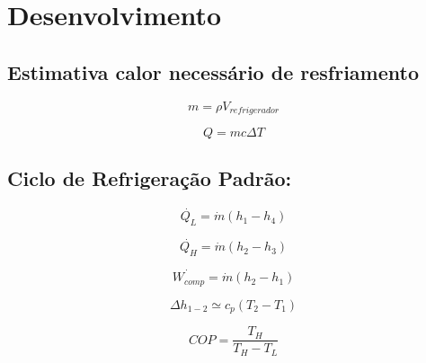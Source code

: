 \chapter{Desenvolvimento}

\section{Estimativa calor necessário de resfriamento}

\begin{equation}
    m = \rho V_{refrigerador}
    \label{massa peixe}
\end{equation}

\begin{equation}
    Q = m c \Delta T
    \label{Q resfriamento}
\end{equation}

\section{Ciclo de Refrigeração Padrão:}

\begin{equation}
    \dot{Q_L} = \dot{m}(h_1-h_4)
    \label{QL}
\end{equation}

\begin{equation}
    \dot{Q_H} = \dot{m}(h_2-h_3)
    \label{QH}
\end{equation}

\begin{equation}
    \dot{W_{comp}} = \dot{m}(h_2-h_1)
    \label{W compressor}
\end{equation}

\begin{equation}
    \Delta h_{1-2} \simeq  c_p (T_2-T_1)
    \label{simplificacao entalpia}
\end{equation}

\begin{equation}
    COP = \frac{T_H}{T_H - T_L}
    \label{COP carnot}
\end{equation}




